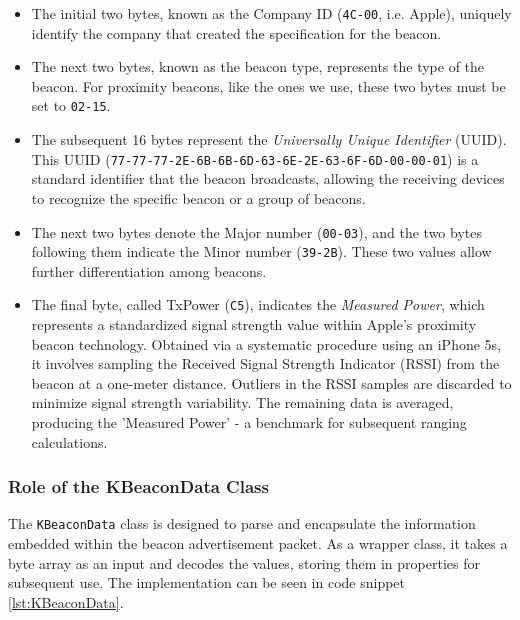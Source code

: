 \begin{itemize}
  \item The initial two bytes, known as the Company ID (\texttt{4C-00}, i.e. Apple), uniquely identify the company that created the specification for the beacon.
  \item The next two bytes, known as the beacon type, represents the type of the beacon. For proximity beacons, like the ones we use, these two bytes must be set to \texttt{02-15}.
  \item The subsequent 16 bytes represent the \textit{Universally Unique Identifier} (UUID).
This UUID (\texttt{77-77-77-2E-6B-6B-6D-63-6E-2E-63-6F-6D-00-00-01}) is a standard identifier that the beacon broadcasts, allowing the receiving devices to recognize the specific beacon or a group of beacons.
  \item The next two bytes denote the Major number (\texttt{00-03}), and the two bytes following them indicate the Minor number (\texttt{39-2B}).
These two values allow further differentiation among beacons.
  \item The final byte, called TxPower (\texttt{C5}), indicates the \textit{Measured Power}, which represents a standardized signal strength value within Apple's proximity beacon technology. Obtained via a systematic procedure using an iPhone 5s, it involves sampling the Received Signal Strength Indicator (RSSI) from the beacon at a one-meter distance. Outliers in the RSSI samples are discarded to minimize signal strength variability. The remaining data is averaged, producing the 'Measured Power' - a benchmark for subsequent ranging calculations.
\end{itemize}
\cite{apple2023ibeacon}

\subsubsection{Role of the KBeaconData Class}

The \texttt{KBeaconData} class is designed to parse and encapsulate the information embedded within the beacon advertisement packet.
As a wrapper class, it takes a byte array as an input and decodes the values, storing them in properties for subsequent use.
The implementation can be seen in code snippet \ref{lst:KBeaconData}.




